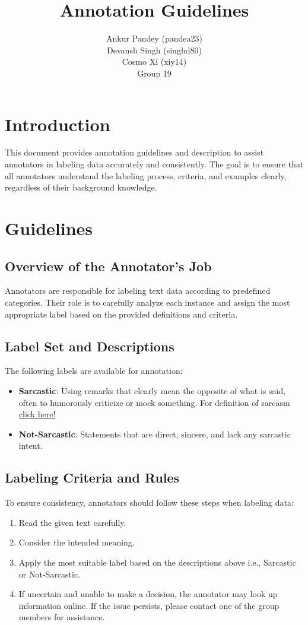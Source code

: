 \documentclass[12pt]{article}
\title{Annotation Guidelines}
\author{
    Ankur Pandey (pandea23) \\ 
    Devansh Singh (singhd80) \\ 
    Cosmo Xi (xiy14) \\ 
    Group 19
}
\date{}
\begin{document}
\maketitle

\section{Introduction}
This document provides annotation guidelines and description to assist annotators in labeling data accurately and consistently. The goal is to ensure that all annotators understand the labeling process, criteria, and examples clearly, regardless of their background knowledge.

\section{Guidelines}

\subsection{Overview of the Annotator's Job}
Annotators are responsible for labeling text data according to predefined categories. Their role is to carefully analyze each instance and assign the most appropriate label based on the provided definitions and criteria.

\subsection{Label Set and Descriptions}
The following labels are available for annotation:

\begin{itemize}
    \item \textbf{Sarcastic}: Using remarks that clearly mean the opposite of what is said, often to humorously criticize or mock something. For definition of sarcasm \href{https://en.wikipedia.org/wiki/Sarcasm}{click here!}
    \item \textbf{Not-Sarcastic}: Statements that are direct, sincere, and lack any sarcastic intent.
\end{itemize}

\subsection{Labeling Criteria and Rules}
To ensure consistency, annotators should follow these steps when labeling data:

\begin{enumerate}
    \item Read the given text carefully.
    \item Consider the intended meaning.
    \item Apply the most suitable label based on the descriptions above i.e., Sarcastic or Not-Sarcastic. 
    \item If uncertain and unable to make a decision, the annotator may look up information online. If the issue persists, please contact one of the group members for assistance.
\end{enumerate}
\end{document}
